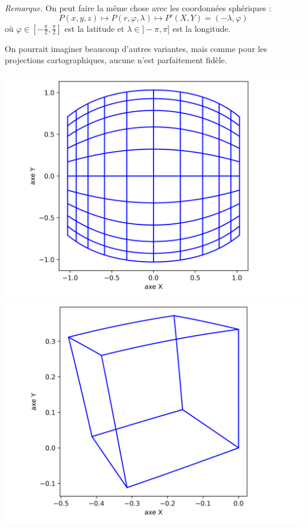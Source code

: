 \documentclass[11pt,class=report,crop=false]{standalone}
\begin{document}

	
\emph{Remarque.} On peut faire la même chose avec les coordonnées sphériques :
$$P(x,y,z) \longmapsto P(r,\varphi,\lambda) \longmapsto P'(X,Y) = (-\lambda,\varphi)$$
où $\varphi \in [-\frac\pi2,\frac\pi2]$  est la latitude et $\lambda \in ]-\pi,\pi]$ est la longitude.


On pourrait imaginer beaucoup d'autres variantes, mais comme pour les projections cartographiques, aucune n'est parfaitement fidèle.

\begin{center}
	\includegraphics[scale=\myscale,scale=0.5]{figures/grille_coordonnees_spheriques}	
	\includegraphics[scale=\myscale,scale=0.5]{figures/cube_coordonnees_spheriques}
\end{center}
\end{document}
